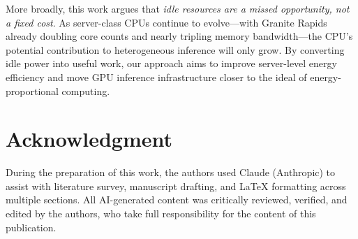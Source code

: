 \documentclass[10pt,conference]{IEEEtran}
\begin{document}
More broadly, this work argues that \emph{idle resources are a missed opportunity, not a fixed cost}.
As server-class CPUs continue to evolve---with Granite Rapids already doubling core counts and nearly tripling memory bandwidth---the CPU's potential contribution to heterogeneous inference will only grow.
By converting idle power into useful work, our approach aims to improve server-level energy efficiency and move GPU inference infrastructure closer to the ideal of energy-proportional computing.

\section*{Acknowledgment}
During the preparation of this work, the authors used Claude (Anthropic) to assist with literature survey, manuscript drafting, and \LaTeX{} formatting across multiple sections.
All AI-generated content was critically reviewed, verified, and edited by the authors, who take full responsibility for the content of this publication.

\balance


\end{document}
